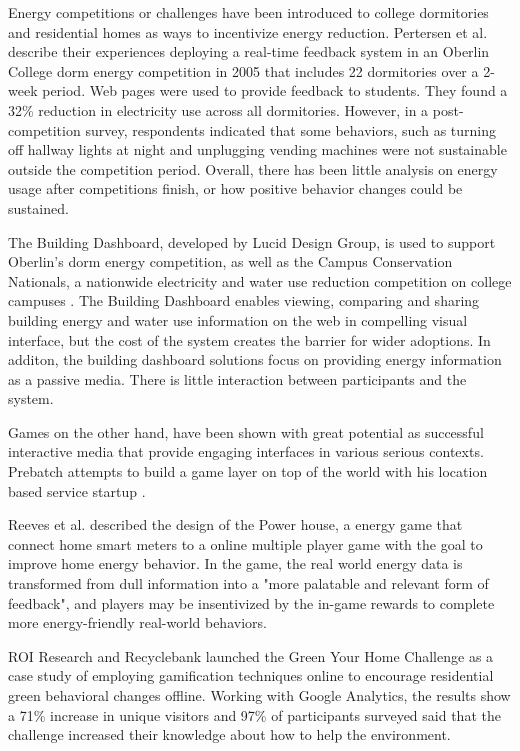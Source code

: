\documentclass{acm_proc_article-sp}
\begin{document}
Energy competitions or challenges have been introduced to college dormitories 
and residential homes as ways to incentivize energy reduction. Pertersen et 
al. describe their experiences deploying a real-time feedback system in an 
Oberlin College dorm energy competition in 2005 that includes 22 dormitories 
over a 2-week period\cite{petersen-dorm-energy-reduction}. Web pages were used 
to provide feedback to students. They found a 32\% reduction in electricity 
use across all dormitories. However, in a post-competition survey, respondents 
indicated that some behaviors, such as turning off hallway lights at night 
and unplugging vending machines were not sustainable outside the competition 
period.  Overall, there has been little analysis on energy usage after 
competitions finish, or how positive behavior changes could be sustained.

The Building Dashboard\cite{building-dashboard}, developed by Lucid Design 
Group, is used to support Oberlin's dorm energy competition,
as well as the Campus Conservation Nationals, a nationwide electricity and 
water use reduction competition on college campuses \cite{competetoreduce}. 
The Building Dashboard enables viewing, comparing and sharing building energy
and water use information on the web in compelling visual interface, but the 
cost of the system creates the barrier for wider adoptions. In additon, the 
building dashboard solutions focus on providing energy information as 
a passive media. There is little interaction between participants and the system.

Games on the other hand, have been shown with great potential as successful
interactive media that provide engaging interfaces in various serious 
contexts\cite{mcgonigal2011reality,reeves2009total}. Prebatch attempts to build
a game layer on top of the world with his location based service startup
\cite{Priebatsch2010ted}. 

Reeves et al. described the design of the Power house, 
a energy game that connect home smart meters to a online multiple player game 
with the goal to improve home energy behavior\cite{Reeves2011powerhouse}. 
In the game, the real world energy data is transformed from dull 
information into a "more palatable and relevant form of feedback", and players 
may be insentivized by the in-game rewards to complete more energy-friendly 
real-world behaviors. 

ROI Research and Recyclebank launched the Green Your Home Challenge as a case 
study of employing gamification techniques online to 
encourage residential green behavioral changes offline\cite{gamingforgood}. 
Working with Google Analytics, the results show a 71\% increase in unique 
visitors and 97\% of participants surveyed said that the challenge increased 
their knowledge about how to help the environment. 
\end{document}

